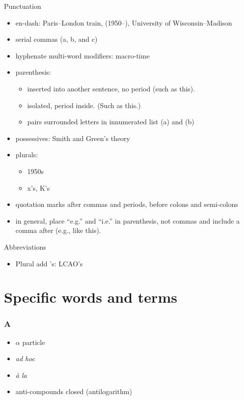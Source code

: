 \documentclass[10pt, letter]{article}
\begin{document}
\begin{multicols}{2}
Punctuation
\begin{itemize}
\item en-dash: Paris--London train, (1950--), University of Wisconsin--Madison
\item serial commas (a, b, and c)
\item hyphenate multi-word modifiers: macro-time
\item parenthesis:
  \begin{itemize}
  \item inserted into another sentence, no period (such as this).
  \item isolated, period inside. (Such as this.)
  \item pairs surrounded letters in innumerated list (a) and (b)
  \end{itemize}
\item possessives: Smith and Green's theory
\item plurals:
  \begin{itemize}
  \item 1950s
  \item x's, K's
  \end{itemize}
\item quotation marks after commas and periods, before colons and
  semi-colons
\item in general, place ``e.g.'' and ``i.e.'' in parenthesis, not
  commas and include a comma after (e.g., like this). 
\end{itemize}

Abbreviations
\begin{itemize}
\item Plural add 's: LCAO's
\end{itemize}

\pagebreak

\section{Specific words and terms}\label{sec:words}

\subsubsection*{A}
\begin{itemize}
\item $\alpha$ particle
\item \textit{ad hoc}
\item \textit{\`{a} la}
\item anti-compounds closed (antilogarithm)
\end{itemize}


\end{multicols}
\end{document}
